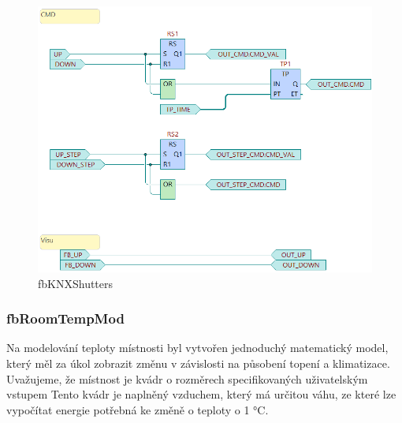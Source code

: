 \begin{figure}[!ht]
    \begin{center}
        \includegraphics[scale=0.7]{obrazky/fbKNXShutters.png}
    \end{center}
    \caption[fbKNXShutters]{fbKNXShutters}
    \label{fig:fbKNXShutters}
\end{figure}
\subsubsection{fbRoomTempMod}
Na modelování teploty místnosti byl vytvořen jednoduchý matematický model, který měl za úkol zobrazit změnu v závislosti na působení topení a klimatizace.
Uvažujeme, že místnost je kvádr o rozměrech specifikovaných uživatelským vstupem Tento kvádr je naplněný vzduchem, který má určitou váhu, ze které lze vypočítat energie potřebná ke změně o teploty o 1 °C.

